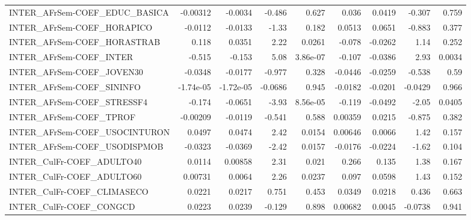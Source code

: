 \begin{tabular}{lrrrrrrrr}
INTER\_AFrSem-COEF\_EDUC\_BASICA         &    -0.00312 &      -0.0034 &  -0.486 &    0.627 &      0.036 &      0.0419 &       -0.307 &         0.759 \\
INTER\_AFrSem-COEF\_HORAPICO            &     -0.0112 &      -0.0133 &   -1.33 &    0.182 &     0.0513 &      0.0651 &       -0.883 &         0.377 \\
INTER\_AFrSem-COEF\_HORASTRAB           &       0.118 &       0.0351 &    2.22 &   0.0261 &     -0.078 &     -0.0262 &         1.14 &         0.252 \\
INTER\_AFrSem-COEF\_INTER               &      -0.515 &       -0.153 &    5.08 & 3.86e-07 &     -0.107 &     -0.0386 &         2.93 &        0.0034 \\
INTER\_AFrSem-COEF\_JOVEN30             &     -0.0348 &      -0.0177 &  -0.977 &    0.328 &    -0.0446 &     -0.0259 &       -0.538 &          0.59 \\
INTER\_AFrSem-COEF\_SININFO             &   -1.74e-05 &    -1.72e-05 & -0.0686 &    0.945 &    -0.0182 &     -0.0201 &      -0.0429 &         0.966 \\
INTER\_AFrSem-COEF\_STRESSF4            &      -0.174 &      -0.0651 &   -3.93 & 8.56e-05 &     -0.119 &     -0.0492 &        -2.05 &        0.0405 \\
INTER\_AFrSem-COEF\_TPROF               &    -0.00209 &      -0.0119 &  -0.541 &    0.588 &    0.00359 &      0.0215 &       -0.875 &         0.382 \\
INTER\_AFrSem-COEF\_USOCINTURON         &      0.0497 &       0.0474 &    2.42 &   0.0154 &    0.00646 &      0.0066 &         1.42 &         0.157 \\
INTER\_AFrSem-COEF\_USODISPMOB          &     -0.0323 &      -0.0369 &   -2.42 &   0.0157 &    -0.0176 &     -0.0224 &        -1.62 &         0.104 \\
INTER\_CulFr-COEF\_ADULTO40             &      0.0114 &      0.00858 &    2.31 &    0.021 &      0.266 &       0.135 &         1.38 &         0.167 \\
INTER\_CulFr-COEF\_ADULTO60             &     0.00731 &       0.0064 &    2.26 &   0.0237 &      0.097 &      0.0598 &         1.43 &         0.152 \\
INTER\_CulFr-COEF\_CLIMASECO            &      0.0221 &       0.0217 &   0.751 &    0.453 &     0.0349 &      0.0218 &        0.436 &         0.663 \\
INTER\_CulFr-COEF\_CONGCD               &      0.0223 &       0.0239 &  -0.129 &    0.898 &    0.00682 &      0.0045 &      -0.0738 &         0.941 \\

\end{tabular}
